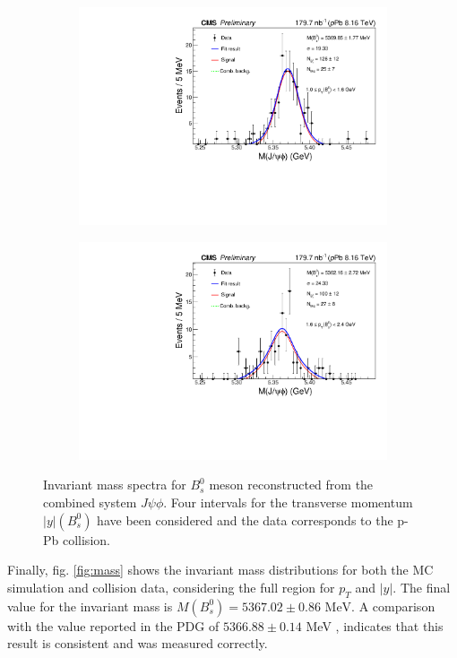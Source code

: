 \begin{figure}
\begin{subfigure}[b]{0.475\textwidth}
		\includegraphics[width=\textwidth]{MainContent/Figs/mass/mass_BsFit_ybins_1.0_1.6.PDF}
		\caption{}
	\end{subfigure}
	\hfill
	\begin{subfigure}[b]{0.475\textwidth}
		\centering
		\includegraphics[width=\textwidth]{MainContent/Figs/mass/mass_BsFit_ybins_1.6_2.4.PDF}
		\caption{}%
	\end{subfigure}
	\caption{Invariant mass spectra for $B^0_s$ meson reconstructed from the combined system $J\psi \phi$. Four intervals for the transverse momentum $|y|(B^0_s)$ have been considered and the data corresponds to the p-Pb collision.}
	\label{fig:mass_ybins}
\end{figure}


Finally, fig. \ref{fig:mass} shows the invariant mass distributions for both the MC simulation and collision data, considering the full region for $p_T$ and $|y|$. The final value for the invariant mass is $M(B^0_s) = 5367.02 \pm 0.86 \text{ MeV}$. A comparison with the value reported in the PDG of $5366.88 \pm 0.14$ MeV \cite{pdgstrange}, indicates that this result is consistent and was measured correctly.

